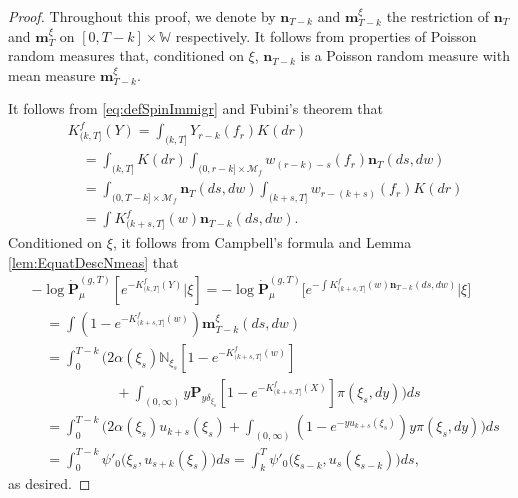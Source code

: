 \documentclass[UTF8]{pkuthss}
\theoremstyle{plain}
\theoremstyle{definition}
\numberwithin{equation}{section}
\begin{document}
\begin{proof}
	Throughout this proof,
we denote by $\mathbf n_{T-k}$ and $\mathbf m^\xi_{T-k}$
	the restriction of $\mathbf n_T$ and $\mathbf m^\xi_T$ on $[0,T-k] \times \mathbb W$ respectively.
	It follows from  properties of Poisson random measures that, conditioned on $\xi$, $\mathbf n_{T-k}$ is a Poisson random measure with mean measure $\mathbf m^\xi_{T-k}$.
\par
	It follows from \eqref{eq:defSpinImmigr} and Fubini's theorem that
\begin{align}\label{eq:kfy_is_nkf}
    &K_{(k,T]}^f(Y)
    = \int_{(k,T]} Y_{r-k}(f_r) K(dr) \\
	&\quad = \int_{(k,T]} K(dr) \int_{(0,r-k] \times \mathcal M_f} w_{(r-k)-s}(f_r) \mathbf n_T(ds,dw)\\
	&\quad = \int_{(0,T-k] \times \mathcal M_f} \mathbf n_T(ds,dw) \int_{(k+s,T]} w_{r-(k+s)}(f_r) K(dr)\\
    &\quad = \int K^f_{(k + s, T]}(w)\mathbf n_{T-k}(ds,dw).
\end{align}
	Conditioned on $\xi$, it follows from Campbell's formula and Lemma \ref{lem:EquatDescNmeas} that
\begin{align}
    &-\log \dot{\mathbf P}^{(g,T)}_\mu[e^{-K^f_{(k, T]}(Y)}|\xi]
    = -\log \dot{\mathbf P}^{(g,T)}_\mu\big[e^{-\int K^f_{(k + s, T]}(w)\mathbf n_{T-k}(ds,dw)}\big|\xi\big]\\
	&\quad = \int(1 - e^{-K_{(k + s, T]}^f (w)})\mathbf m^\xi_{T-k}(ds,dw)\\
	&\quad = \int_0^{T-k} \Big(2\alpha(\xi_s) \mathbb N_{\xi_s}[1 - e^{-K_{(k + s, T]}^f(w)}] \\
	&\qquad\qquad\qquad + \int_{(0,\infty)} y \mathbf P_{y \delta_{\xi_s}}[1 - e^{-K_{(k + s, T]}^f(X)}] \pi(\xi_s,dy)\Big) ds\\
	&\quad = \int_0^{T-k} \Big(2\alpha(\xi_s) u_{k+s}(\xi_s) + \int_{(0,\infty)} (1 - e^{-yu_{k+s}(\xi_s)})y\pi(\xi_s,dy)\Big) ds
	\\&\quad =\int_0^{T-k} \psi'_0\big(\xi_s,u_{s+k}(\xi_s)\big) ds
	=\int_k^T \psi'_0\big(\xi_{s-k},u_s(\xi_{s-k})\big) ds,
\end{align}
	as desired.
\end{proof}
\end{document}
